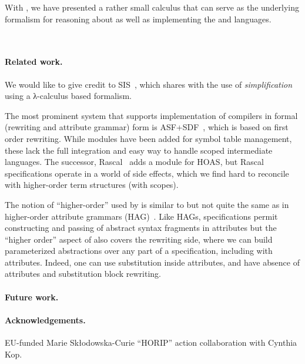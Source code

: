\documentclass[letterpaper,11pt]{article}
\begin{document}
With \hax, we have presented a rather small calculus that can serve as the underlying formalism for
reasoning about as well as implementing the \CRSX and \HAX languages.


~\cite{Knuth:mst1968} 
~\cite{Aho+:2006}


\paragraph*{Related work.}

We would like to give credit to SIS~\cite{Mosses:daimi1979}, which shares with \hax the use of
\emph{simplification} using a λ-calculus based formalism.

The most prominent system that supports implementation of compilers in formal (rewriting and
attribute grammar) form is ASF+SDF~\cite{Brand+:toplas2002}, which is based on first order
rewriting. While modules have been added for symbol table management, these lack the full
integration and easy way to handle scoped intermediate languages. The successor,
Rascal~\cite{Bos+:eptcs2011} adds a module for HOAS, but Rascal specifications operate in a world of
side effects, which we find hard to reconcile with higher-order term structures (with scopes).

The notion of ``higher-order'' used by \hax is similar to but not quite the same as in higher-order
attribute grammars (HAG)~\cite{VogtSwierstraKuiper:pldi1989}. Like HAGs, \hax specifications permit
constructing and passing of abstract syntax fragments in attributes but the ``higher order'' aspect
of \hax also covers the rewriting side, where we can build parameterized abstractions over any part
of a specification, including with attributes. Indeed, one can use substitution inside attributes,
and have absence of attributes and substitution block rewriting.

\paragraph*{Future work.} 


\paragraph*{Acknowledgements.} 

EU-funded Marie Skłodowska-Curie ``HORIP'' action collaboration with Cynthia Kop.
\end{document}
